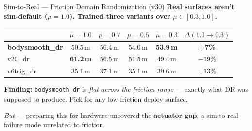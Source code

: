 \documentclass[aspectratio=169]{beamer}
\begin{document}
\begin{frame}{Sim-to-Real --- Friction Domain Randomization (v30)}
\textbf{Real surfaces aren't sim-default ($\mu{=}1.0$). Trained three variants over $\mu \in [0.3, 1.0]$.}

\vspace{0.3em}
\small
\begin{tabular}{lcccc|c}
    \toprule
    & $\mu{=}1.0$ & $\mu{=}0.7$ & $\mu{=}0.5$ & $\mu{=}0.3$ & $\Delta(1.0\to0.3)$ \\
    \midrule
    \textbf{bodysmooth\_dr} & 50.5\,m & 56.4\,m & 54.0\,m & \textbf{53.9\,m} & \textbf{+7\%} \\
    v20\_dr               & \textbf{61.2\,m} & 56.5\,m & 51.5\,m & 49.4\,m & $-19$\% \\
    v6trig\_dr            & 35.1\,m & 37.1\,m & 35.1\,m & 39.6\,m & $+13\%$ \\
    \bottomrule
\end{tabular}
\normalsize

\vspace{0.5em}
\textbf{Finding:} \texttt{bodysmooth\_dr} is \emph{flat across the friction range} --- exactly what DR was supposed to produce. Pick for any low-friction deploy surface.

\vspace{0.5em}
\textit{But} --- preparing this for hardware uncovered the \textbf{actuator gap}, a sim-to-real failure mode unrelated to friction.
\end{frame}
\end{document}
